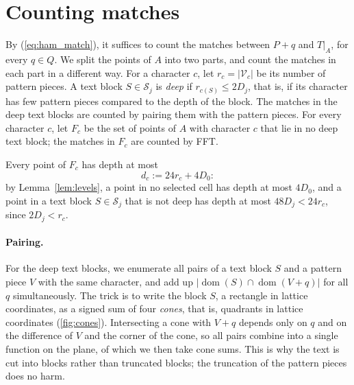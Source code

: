 \documentclass[11pt]{article}
\theoremstyle{definition}
\DeclareMathOperator{\dom}{dom}
\newcommand{\cS}{\mathcal{S}}
\newcommand{\cV}{\mathcal{V}}
\newcommand{\abs}[1]{\lvert #1 \rvert}
\begin{document}
\section{Counting matches}
\label{sec:counting}

By (\ref{eq:ham_match}), it suffices to count the matches between $P + q$ and $T|_A$, for every $q \in Q$.
We split the points of $A$ into two parts, and count the matches in each part in a different way.
For a character $c$, let $r_c = \abs{\cV_c}$ be its number of pattern pieces.
A text block $S \in \cS_j$ is \emph{deep} if $r_{c(S)} \le 2D_j$, that is, if its character has few pattern pieces compared to the depth of the block.
The matches in the deep text blocks are counted by pairing them with the pattern pieces.
For every character $c$, let $F_c$ be the set of points of $A$ with character $c$ that lie in no deep text block; the matches in $F_c$ are counted by FFT.

Every point of $F_c$ has depth at most
\begin{equation}\label{eq:remainder}
d_c := 24r_c + 4D_0:
\end{equation}
by Lemma~\ref{lem:levels}, a point in no selected cell has depth at most $4D_0$, and a point in a text block $S \in \cS_j$ that is not deep has depth at most $48D_j < 24r_c$, since $2D_j < r_c$.

\paragraph{Pairing.}
For the deep text blocks, we enumerate all pairs of a text block $S$ and a pattern piece $V$ with the same character, and add up $\abs{\dom(S) \cap \dom(V + q)}$ for all $q$ simultaneously.
The trick is to write the block $S$, a rectangle in lattice coordinates, as a signed sum of four \emph{cones}, that is, quadrants in lattice coordinates (\autoref{fig:cones}).
Intersecting a cone with $V + q$ depends only on $q$ and on the difference of $V$ and the corner of the cone, so all pairs combine into a single function on the plane, of which we then take cone sums.
This is why the text is cut into blocks rather than truncated blocks; the truncation of the pattern pieces does no harm.
\end{document}
